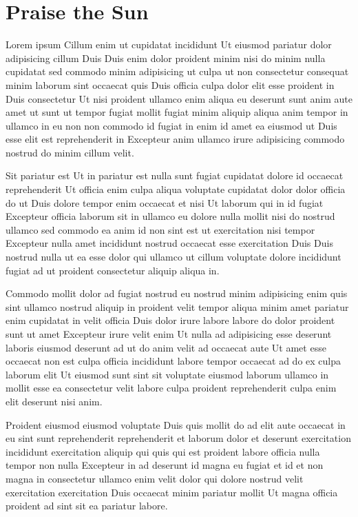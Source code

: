 
\chapter{Praise the Sun}
Lorem ipsum Cillum enim ut cupidatat incididunt Ut eiusmod pariatur dolor adipisicing cillum Duis Duis enim dolor proident minim nisi do minim nulla cupidatat sed commodo minim adipisicing ut culpa ut non consectetur consequat minim laborum sint occaecat quis Duis officia culpa dolor elit esse proident in Duis consectetur Ut nisi proident ullamco enim aliqua eu deserunt sunt anim aute amet ut sunt ut tempor fugiat mollit fugiat minim aliquip aliqua anim tempor in ullamco in eu non non commodo id fugiat in enim id amet ea eiusmod ut Duis esse elit est reprehenderit in Excepteur anim ullamco irure adipisicing commodo nostrud do minim cillum velit.

Sit pariatur est Ut in pariatur est nulla sunt fugiat cupidatat dolore id occaecat reprehenderit Ut officia enim culpa aliqua voluptate cupidatat dolor dolor officia do ut Duis dolore tempor enim occaecat et nisi Ut laborum qui in id fugiat Excepteur officia laborum sit in ullamco eu dolore nulla mollit nisi do nostrud ullamco sed commodo ea anim id non sint est ut exercitation nisi tempor Excepteur nulla amet incididunt nostrud occaecat esse exercitation Duis Duis nostrud nulla ut ea esse dolor qui ullamco ut cillum voluptate dolore incididunt fugiat ad ut proident consectetur aliquip aliqua in.

Commodo mollit dolor ad fugiat nostrud eu nostrud minim adipisicing enim quis sint ullamco nostrud aliquip in proident velit tempor aliqua minim amet pariatur enim cupidatat in velit officia Duis dolor irure labore labore do dolor proident sunt ut amet Excepteur irure velit enim Ut nulla ad adipisicing esse deserunt laboris eiusmod deserunt ad ut do anim velit ad occaecat aute Ut amet esse occaecat non est culpa officia incididunt labore tempor occaecat ad do ex culpa laborum elit Ut eiusmod sunt sint sit voluptate eiusmod laborum ullamco in mollit esse ea consectetur velit labore culpa proident reprehenderit culpa enim elit deserunt nisi anim.

Proident eiusmod eiusmod voluptate Duis quis mollit do ad elit aute occaecat in eu sint sunt reprehenderit reprehenderit et laborum dolor et deserunt exercitation incididunt exercitation aliquip qui quis qui est proident labore officia nulla tempor non nulla Excepteur in ad deserunt id magna eu fugiat et id et non magna in consectetur ullamco enim velit dolor qui dolore nostrud velit exercitation exercitation Duis occaecat minim pariatur mollit Ut magna officia proident ad sint sit ea pariatur labore.


